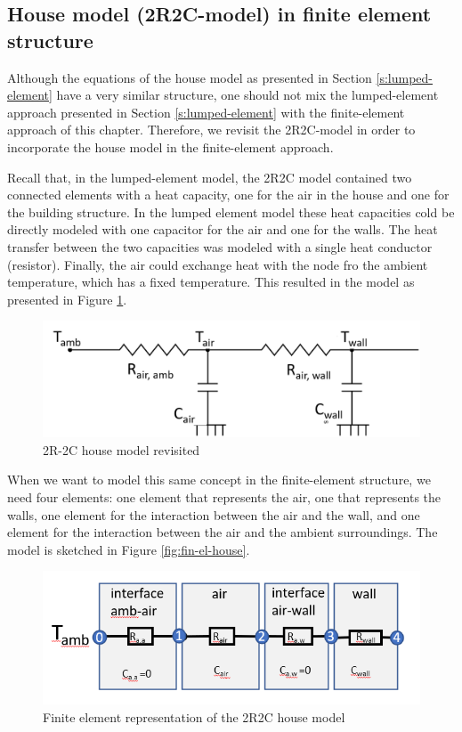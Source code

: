 \subsection{House model (2R2C-model) in finite element structure}

Although the equations of the house model as presented in Section \ref{s:lumped-element} have a very similar structure, one should not mix the lumped-element approach presented in Section \ref{s:lumped-element} with the finite-element approach of this chapter. Therefore, we revisit the 2R2C-model in order to incorporate the house model in the finite-element approach. 

Recall that, in the lumped-element model, the 2R2C model contained two connected elements with a heat capacity, one for the air in the house and one for the building structure. In the lumped element model these heat capacities cold be directly modeled with one capacitor for the air and one for the walls. The heat transfer between the two capacities was modeled with a single heat conductor (resistor). Finally, the air could exchange heat with the node fro the ambient temperature, which has a fixed temperature. This resulted in the model as presented in Figure \ref{fig:2R2Cagain}. 
\begin{figure}[H]
	\centering
	\includegraphics[width=0.7\columnwidth]{Figures/2R2Cmodel_rev.png}
	\caption[Short title]{2R-2C house model revisited}
	\label{fig:2R2Cagain}
\end{figure}

When we want to model this same concept in the finite-element structure, we need four elements: one element that represents the air, one that represents the walls, one element for the interaction between the air and the wall, and one element for the interaction between the air and the ambient surroundings. The model is sketched in Figure \ref{fig:fin-el-house}.
\begin{figure}[H]
	\centering
	\includegraphics[width=0.7\columnwidth]{Figures/finite_element_house.png}
	\caption[Short title]{Finite element representation of the 2R2C house model}
	\label{fig:fin-elhouse}
\end{figure}

